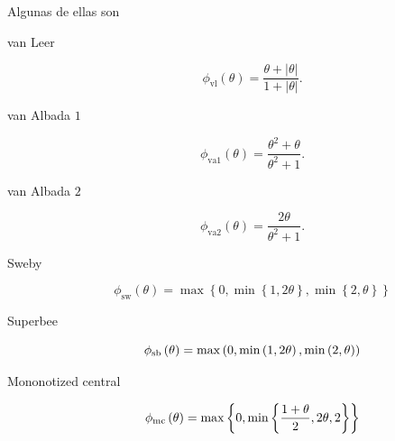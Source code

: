 Algunas de ellas son
\begin{description}
	\item[van Leer]

	      \begin{equation*}
		      \phi_{\text{vl}}
		      \left(\theta\right)=
		      \frac{\theta+\left|\theta\right|}{1+\left|\theta\right|}.
	      \end{equation*}

	\item[van Albada $1$]

	      \begin{equation*}
		      \phi_{\text{va1}}
		      \left(\theta\right)=
		      \frac{\theta^{2}+\theta}{\theta^{2}+1}.
	      \end{equation*}

	\item[van Albada $2$]

	      \begin{equation*}
		      \phi_{\text{va2}}
		      \left(\theta\right)=
		      \frac{2\theta}{\theta^{2}+1}.
	      \end{equation*}

	\item[Sweby]

	      \begin{equation*}
		      \phi_{\text{sw}}
		      \left(\theta\right)=
		      \max
		      \left\{
		      0,
		      \min
		      \left\{1,2\theta\right\},
		      \min
		      \left\{2,\theta\right\}
		      \right\}
	      \end{equation*}

	\item[Superbee]

	      \begin{equation*}
		      \phi_{\text{\text{sb}}}
		      \left(\theta\right)=
		      \max
		      \left(
		      0,
		      \min\left(1,2\theta\right),
		      \min\left(2,\theta\right)
		      \right)
	      \end{equation*}

	\item[Mononotized central]

	      \begin{equation*}
		      \phi_{\text{\text{mc}}}
		      \left(\theta\right)=
		      \max
		      \left\{
		      0,
		      \min
		      \left\{
		      \frac{1+\theta}{2},2\theta,2
		      \right\}
		      \right\}
	      \end{equation*}


\end{description}
